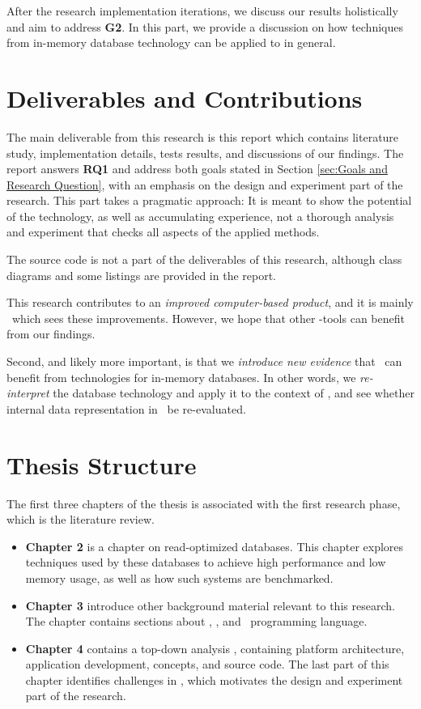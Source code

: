 After the research implementation iterations, we discuss our results holistically and aim to address \textbf{G2}. In this part, we provide a discussion on how techniques from in-memory database technology can be applied to \mde in general.

\section{Deliverables and Contributions}
\label{sec:Deliverables and Contributions}
The main deliverable from this research is this report which contains literature study, implementation details, tests results, and discussions of our findings. The report answers \textbf{RQ1} and address both goals stated in Section \ref{sec:Goals and Research Question}, with an emphasis on the design and experiment part of the research. This part takes a pragmatic approach: It is meant to show the potential of the technology, as well as accumulating experience, not a thorough analysis and experiment that checks all aspects of the applied methods. 

The source code is not a part of the deliverables of this research, although class diagrams and some listings are provided in the report.

This research contributes to an \textit{improved computer-based product}, and it is mainly \gap~which sees these improvements. However, we hope that other \mde-tools can benefit from our findings. 

Second, and likely more important, is that we \textit{introduce new evidence} that \mde~can benefit from technologies for in-memory databases. In other words, we \textit{re-interpret} the database technology and apply it to the context of \mde, and see whether internal data representation in \mde~be re-evaluated.


\section{Thesis Structure}
\label{sec:Thesis Structure}
The first three chapters of the thesis is associated with the first research phase, which is the literature review.
\begin{itemize}
  \item \textbf{Chapter 2} is a chapter on read-optimized databases. This chapter explores techniques used by these databases to achieve high performance and low memory usage, as well as how such systems are benchmarked. 
  \item \textbf{Chapter 3} introduce other background material relevant to this research. The chapter contains sections about \mde, \bd, and \delphi~programming language.
  \item \textbf{Chapter 4} contains a top-down analysis \gap, containing platform architecture, application development, concepts, and source code. The last part of this chapter identifies challenges in \gap, which motivates the design and experiment part of the research.
\end{itemize}


